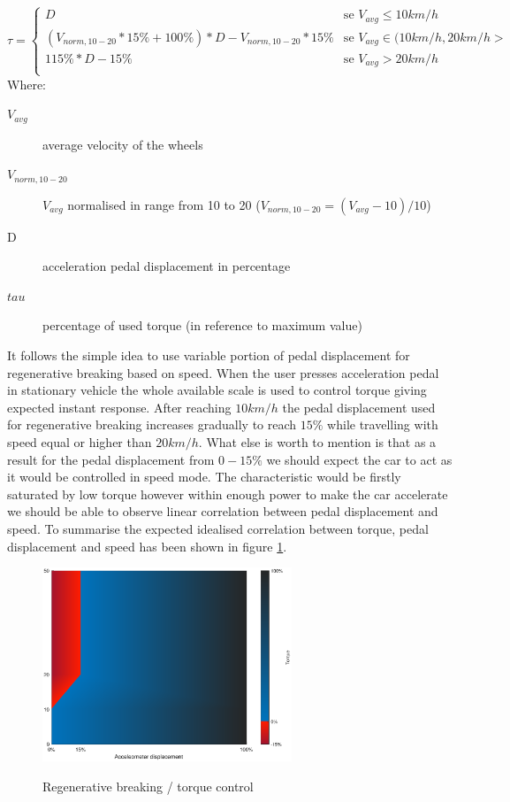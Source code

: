 \begin{equation*}
    \tau = \begin{cases}
        D & \text{se $V_{avg} \leq 10km/h$}\\
        (V_{norm,10-20} * 15\% + 100\%) * D - V_{norm,10-20} * 15\% & \text{se $V_{avg} \in (10km/h,20km/h>$}\\
        115\% * D - 15\% & \text{se $V_{avg} > 20km/h$}\\
    \end{cases}
    \label{reg_break_eq}
\end{equation*}
Where:
\begin{description}
    \item[$V_{avg}$] average velocity of the wheels 
    \item[$V_{norm,10-20}$] $V_{avg}$ normalised in range from 10 to 20 ($V_{norm,10-20}=(V_{avg}-10)/10$)
    \item[D] acceleration pedal displacement in percentage
    \item[$tau$] percentage of used torque (in reference to maximum value)
\end{description}

It follows the simple idea to use variable portion of pedal displacement for regenerative breaking based on speed.
When the user presses acceleration pedal in stationary vehicle the whole available scale is used to control torque giving expected instant response. After reaching $10km/h$ the pedal  displacement used for regenerative breaking increases gradually to reach $15\%$ while travelling with speed equal or higher than $20km/h$.
What else is worth to mention is that as a result for the pedal displacement from $0-15\%$ we should expect the car to act as it would be controlled in speed mode.\label{speed_mode} The characteristic would be firstly saturated by low torque however within enough power to make the car accelerate we should be able to observe linear correlation between pedal displacement and speed.
To summarise the expected idealised correlation between torque, pedal displacement and speed has been shown in figure \ref{regen_ideal}.

\begin{figure}[h]
    \centering
           \includegraphics[height=5.8cm]{figures/regen_ideal}
            \label{regen_ideal}
        \caption{Regenerative breaking / torque control}
\end{figure}




